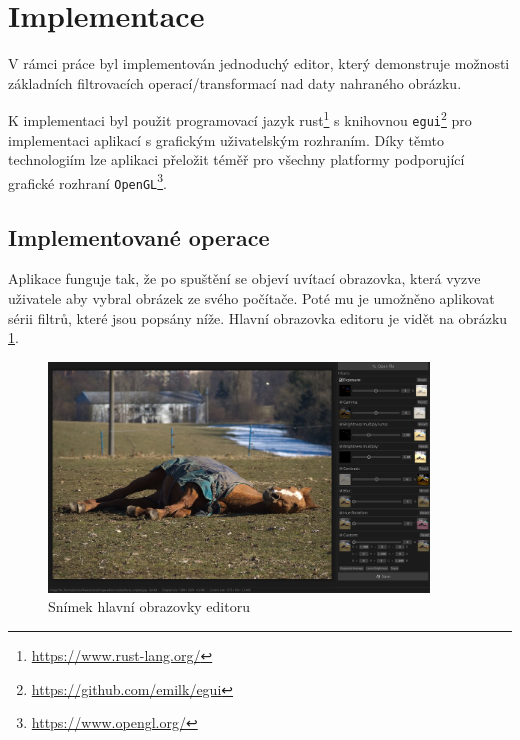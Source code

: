 \documentclass[11pt, a4paper, titlepage]{article}
\begin{document}
\section{Implementace}
V rámci práce byl implementován jednoduchý editor, který demonstruje možnosti základních filtrovacích operací/transformací nad daty nahraného obrázku.

K implementaci byl použit programovací jazyk rust\footnote{\url{https://www.rust-lang.org/}} s knihovnou \texttt{egui}\footnote{\url{https://github.com/emilk/egui}} pro implementaci aplikací s grafickým uživatelským rozhraním.
Díky těmto technologiím lze aplikaci přeložit téměř pro všechny platformy podporující grafické rozhraní \texttt{OpenGL}\footnote{\url{https://www.opengl.org/}}.
\subsection{Implementované operace}
Aplikace funguje tak, že po spuštění se objeví uvítací obrazovka, která vyzve uživatele aby vybral obrázek ze svého počítače. Poté mu je umožněno aplikovat sérii filtrů, které jsou popsány níže.
Hlavní obrazovka editoru je vidět na obrázku \ref{fig:screenshot}.
\begin{figure}[h]
    \centering
    \includegraphics[width=0.9\textwidth]{screenshot.png}
    \caption{Snímek hlavní obrazovky editoru}
    \label{fig:screenshot}
\end{figure}
\end{document}
